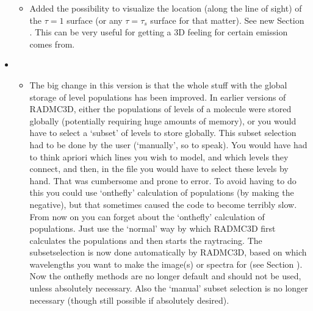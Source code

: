 \documentclass[letterpaper,10pt,english]{sphinxmanual}
\begin{document}
\begin{itemize}
\begin{itemize}
\item {} 
Added the possibility to visualize the location (along the line of
sight) of the \(\tau=1\) surface (or any \(\tau=\tau_s\) surface for that
matter). See new Section {\hyperref[\detokenize{imagesspectra:sec-tausurf}]{}}. This can be very useful
for getting a 3\sphinxhyphen{}D feeling for  certain emission comes from.

\end{itemize}

\item {} 
\begin{itemize}
\item {} 
The big change in this version is that the whole stuff with the
global storage of level populations has been improved. In earlier
versions of RADMC\sphinxhyphen{}3D, either the populations of  levels of a
molecule were stored globally (potentially requiring huge amounts of
memory), or you would have to select a ‘subset’ of levels to store
globally. This subset selection had to be done by the user
(‘manually’, so to speak). You would have had to think a\sphinxhyphen{}priori which
lines you wish to model, and which levels they connect, and then, in the
 file you would have to select these levels by
hand. That was cumbersome and prone to error. To avoid having to do this
you could use ‘on\sphinxhyphen{}the\sphinxhyphen{}fly’ calculation of populations (by making the
 negative), but that sometimes caused the code to
become terribly slow.  From now
on you can forget about the ‘on\sphinxhyphen{}the\sphinxhyphen{}fly’ calculation of populations.
Just use the ‘normal’ way by which RADMC\sphinxhyphen{}3D first calculates the
populations and then starts the ray\sphinxhyphen{}tracing. The subset\sphinxhyphen{}selection is now
done automatically by RADMC\sphinxhyphen{}3D, based on which wavelengths you want to
make the image(s) or spectra for (see Section
{\hyperref[\detokenize{lineradtrans:sec-calcstore-levpop}]{}}). Now the on\sphinxhyphen{}the\sphinxhyphen{}fly methods are no longer
default and should not be used, unless absolutely necessary. Also the
‘manual’ subset selection is no longer necessary (though still
possible if absolutely desired).


\end{itemize}
\end{itemize}
\end{document}
